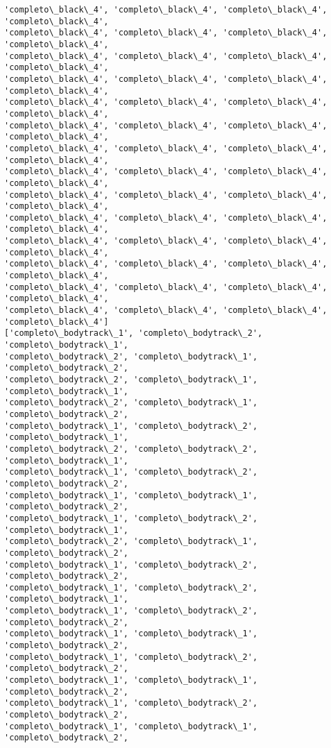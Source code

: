 \documentclass[11pt]{article}
\begin{document}
\begin{Verbatim}[commandchars=\\\{\}]
'completo\_black\_4', 'completo\_black\_4', 'completo\_black\_4', 'completo\_black\_4',
'completo\_black\_4', 'completo\_black\_4', 'completo\_black\_4', 'completo\_black\_4',
'completo\_black\_4', 'completo\_black\_4', 'completo\_black\_4', 'completo\_black\_4',
'completo\_black\_4', 'completo\_black\_4', 'completo\_black\_4', 'completo\_black\_4',
'completo\_black\_4', 'completo\_black\_4', 'completo\_black\_4', 'completo\_black\_4',
'completo\_black\_4', 'completo\_black\_4', 'completo\_black\_4', 'completo\_black\_4',
'completo\_black\_4', 'completo\_black\_4', 'completo\_black\_4', 'completo\_black\_4',
'completo\_black\_4', 'completo\_black\_4', 'completo\_black\_4', 'completo\_black\_4',
'completo\_black\_4', 'completo\_black\_4', 'completo\_black\_4', 'completo\_black\_4',
'completo\_black\_4', 'completo\_black\_4', 'completo\_black\_4', 'completo\_black\_4',
'completo\_black\_4', 'completo\_black\_4', 'completo\_black\_4', 'completo\_black\_4',
'completo\_black\_4', 'completo\_black\_4', 'completo\_black\_4', 'completo\_black\_4',
'completo\_black\_4', 'completo\_black\_4', 'completo\_black\_4', 'completo\_black\_4',
'completo\_black\_4', 'completo\_black\_4', 'completo\_black\_4', 'completo\_black\_4']
['completo\_bodytrack\_1', 'completo\_bodytrack\_2', 'completo\_bodytrack\_1',
'completo\_bodytrack\_2', 'completo\_bodytrack\_1', 'completo\_bodytrack\_2',
'completo\_bodytrack\_2', 'completo\_bodytrack\_1', 'completo\_bodytrack\_1',
'completo\_bodytrack\_2', 'completo\_bodytrack\_1', 'completo\_bodytrack\_2',
'completo\_bodytrack\_1', 'completo\_bodytrack\_2', 'completo\_bodytrack\_1',
'completo\_bodytrack\_2', 'completo\_bodytrack\_2', 'completo\_bodytrack\_1',
'completo\_bodytrack\_1', 'completo\_bodytrack\_2', 'completo\_bodytrack\_2',
'completo\_bodytrack\_1', 'completo\_bodytrack\_1', 'completo\_bodytrack\_2',
'completo\_bodytrack\_1', 'completo\_bodytrack\_2', 'completo\_bodytrack\_1',
'completo\_bodytrack\_2', 'completo\_bodytrack\_1', 'completo\_bodytrack\_2',
'completo\_bodytrack\_1', 'completo\_bodytrack\_2', 'completo\_bodytrack\_2',
'completo\_bodytrack\_1', 'completo\_bodytrack\_2', 'completo\_bodytrack\_1',
'completo\_bodytrack\_1', 'completo\_bodytrack\_2', 'completo\_bodytrack\_2',
'completo\_bodytrack\_1', 'completo\_bodytrack\_1', 'completo\_bodytrack\_2',
'completo\_bodytrack\_1', 'completo\_bodytrack\_2', 'completo\_bodytrack\_2',
'completo\_bodytrack\_1', 'completo\_bodytrack\_1', 'completo\_bodytrack\_2',
'completo\_bodytrack\_1', 'completo\_bodytrack\_2', 'completo\_bodytrack\_2',
'completo\_bodytrack\_1', 'completo\_bodytrack\_1', 'completo\_bodytrack\_2',

\end{Verbatim}
\end{document}
